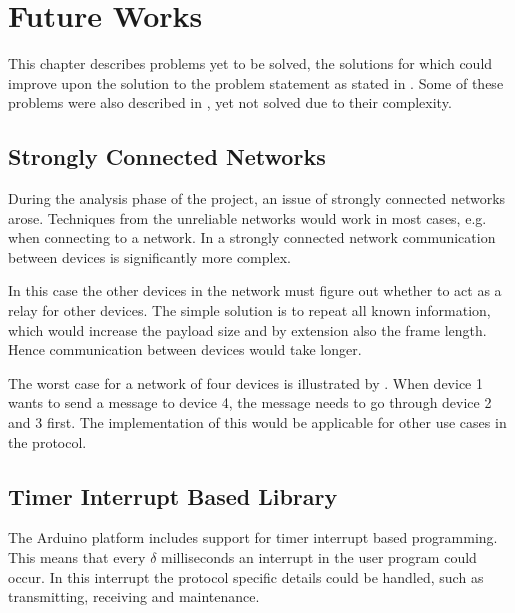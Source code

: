 \chapter{Future Works}\label{futureWorks}
This chapter describes problems yet to be solved, the solutions for which could improve upon the solution to the problem statement as stated in . 
Some of these problems were also described in , yet not solved due to their complexity.

\section{Strongly Connected Networks}
During the analysis phase of the project, an issue of strongly connected networks arose.  
Techniques from the unreliable networks would work in most cases, e.g. when connecting to a network. 
In a strongly connected network communication between devices is significantly more complex.

\noindent
In this case the other devices in the network must figure out whether to act as a relay for other devices. 
The simple solution is to repeat all known information, which would increase the payload size and by extension also the frame length.
Hence communication between devices would take longer.

The worst case for a network of four devices is illustrated by .
When device 1 wants to send a message to device 4, the message needs to go through device 2 and 3 first.
The implementation of this would be applicable for other use cases in the protocol. 

\section{Timer Interrupt Based Library}
The Arduino platform includes support for timer interrupt based programming.
This means that every $\delta$ milliseconds an interrupt in the user program could occur.
In this interrupt the protocol specific details could be handled, such as transmitting, receiving and maintenance.


